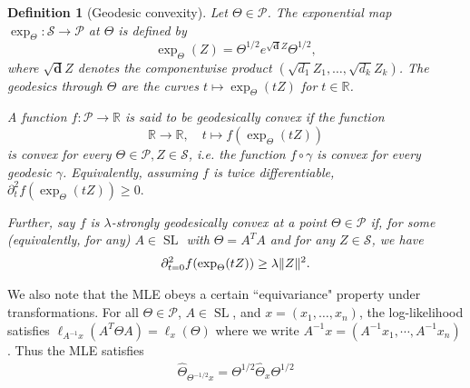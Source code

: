 \documentclass{article}
\newtheorem{definition}{Definition}
\DeclarePairedDelimiter{\norm}{\lVert}{\rVert}
\newcommand{\R}{{\mathbb{R}}}
\renewcommand{\vec}{\bm}
\newcommand\SL{\operatorname{SL}}
\newcommand\Sym{\mathcal{S}}
\newcommand\SPD{\mathcal{P}}
\newcommand\samp{x}
\newcommand\tr{\operatorname{Tr}}
\newcommand{\CF}[1]{{\color{purple}[CF: #1]}}
\begin{document}
\begin{definition}[Geodesic convexity]\label{dfn:g-convexity}
 Let $\Theta \in \SPD$. The \emph{exponential map} $\exp_\Theta:\Sym \to \SPD$ at $\Theta$ is defined by 
$$ \exp_\Theta(Z) = \Theta^{1/2} e^{\sqrt{\vec d}Z} \Theta^{1/2},$$
where $\sqrt{\vec d} Z$ denotes the componentwise product $(\sqrt{d_1} Z_1, \dots, \sqrt{d_k}Z_k)$.
The geodesics through $\Theta$ are the curves $t\mapsto \exp_\Theta(tZ)$ for $t \in \R$. 


A function $f\colon \SPD \to \R$ is said to be \emph{geodesically convex} if the function 
$$\R \to \R, \quad t \mapsto f (\exp_\Theta( tZ))$$ is convex for every $\Theta \in \SPD, Z \in \Sym$, i.e. the function $f \circ \gamma$ is convex for every geodesic $\gamma$. Equivalently, assuming $f$ is twice differentiable, $\partial^2_t f(\exp_\Theta(tZ)) \geq 0.$ 

Further, say $f$ is \emph{$\lambda$-strongly geodesically convex} at a point $\Theta \in \SPD$ if, for some (equivalently, for any) $A \in \SL$ with $\Theta = A^T A$ and for any $Z \in \Sym$, we have
\begin{align*}
  \partial^2_{t=0} f(\exp_\Theta(tZ)) \geq \lambda \norm{Z}^2.
\end{align*}
\end{definition}
We also note that the MLE obeys a certain ``equivariance" property under transformations. For all $\Theta \in \SPD$, $A \in \SL$, and $\samp=(\samp_1,\dots,\samp_n)$, the log-likelihood satisfies $\ell_{A^{-1} \samp}(A^T \Theta A) = \ell_{\samp}(\Theta)$ where we write $A^{-1} \samp = (A^{-1} \samp_1,\cdots,A^{-1} \samp_n)$.  Thus the MLE satisfies
\begin{align}\label{eq:equivariance}
\widehat\Theta_{\Theta^{-1/2} \samp} = \Theta^{1/2} \widehat\Theta_{\samp} \Theta^{1/2}\end{align}
\end{document}

